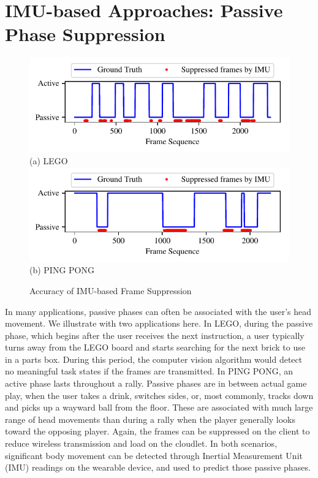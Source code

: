 \section{IMU-based Approaches: Passive Phase Suppression}


\begin{figure}[h]
\begin{center}
\includegraphics[width=.9\linewidth]{FIGS/fig-imu-trace-lego.pdf}\\
{\small (a) LEGO}
\includegraphics[width=.9\linewidth]{FIGS/fig-imu-trace-pingpong.pdf}\\
{\small (b) PING PONG}
\end{center}
\vspace{-0.1in}
\caption{\small Accuracy of IMU-based Frame Suppression}
\label{fig:imu-trace-example}
\vspace{-0.1in}
\end{figure}

In many applications, passive phases can often be associated with the
user's head movement. We illustrate with two applications here. In
LEGO, during the passive phase, which begins after the user receives
the next instruction, a user typically turns away from the LEGO board
and starts searching for the next brick to use in a parts box. During
this period, the computer vision algorithm would detect no meaningful
task states if the frames are transmitted.  In PING PONG, an active
phase lasts throughout a rally.  Passive phases are in between actual
game play, when the user takes a drink, switches sides, or, most
commonly, tracks down and picks up a wayward ball from the floor.
These are associated with much large range of head movements than
during a rally when the player generally looks toward the opposing
player.  Again, the frames can be suppressed on the client to reduce
wireless transmission and load on the cloudlet.  In both scenarios,
significant body movement can be detected through Inertial Measurement
Unit (IMU) readings on the wearable device, and used to predict those
passive phases.

